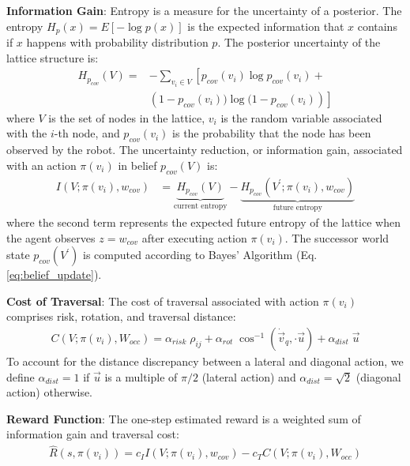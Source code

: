 \documentclass[letterpaper]{article} %
\newcommand{\ph}[1]{{\textbf{#1}:}} %
\begin{document}
\ph{Information Gain} Entropy is a measure for the uncertainty of a posterior. The entropy $H_p(x) = E[-\log p(x)]$ is the expected information that $x$ contains if $x$ happens with probability distribution $p$. The posterior uncertainty of the lattice structure is:
\begin{align}
    H_{p_{cov}}(V) =& 
    -\sum_{v_i \in V} \left[ p_{cov}(v_i) \log p_{cov}(v_i) + \right. \nonumber \\
      & \left. \left(1-p_{cov}(v_i)) \log (1-p_{cov}(v_i)\right) \right]
\end{align}
where $V$ is the set of nodes in the lattice, $v_i$ is the random variable associated with the $i$-th node, and $p_{cov}(v_i)$ is the probability that the node has been observed by the robot. The uncertainty reduction, or information gain, associated with an action $\pi(v_i)$ in belief $p_{cov}(V)$ is:
\begin{align}
    I(V; \pi(v_i), w_{cov}) &= \underbrace{H_{p_{cov}}(V)}_\text{current entropy} - \underbrace{H_{p_{cov}}(V^\prime; \pi(v_i), w_{cov})}_\text{future entropy}
\end{align}
where the second term represents the expected future entropy of the lattice when the agent observes $z = w_{cov}$ after executing action $\pi(v_i)$. The successor world state $p_{cov}(V^\prime)$ is computed according to Bayes' Algorithm (Eq. \ref{eq:belief_update}). 

\ph{Cost of Traversal} The cost of traversal associated with action $\pi(v_i)$ comprises risk, rotation, and traversal distance:
\begin{align}
    C(V; \pi(v_i), W_{occ}) = \alpha_{risk} \; \rho_{ij} + \alpha_{rot} \;  \cos^{-1}(\dot{\vec{v}}_q, \cdot \vec{u}) + \alpha_{dist} \; \vec{u}
    \label{eq:traversal_cost}
\end{align}
To account for the distance discrepancy between a lateral and diagonal action, we define $\alpha_{dist}=1$ if $\vec{u}$ is a multiple of $\pi/2$ (lateral action) and $\alpha_{dist}=\sqrt{2}$ (diagonal action) otherwise.





\ph{Reward Function} The one-step estimated reward is a weighted sum of information gain and traversal cost:
\begin{align}
    \hat{R}(s, \pi(v_i)) = c_{I} I(V; \pi(v_i), w_{cov}) - c_{T}  C(V; \pi(v_i), W_{occ})
    \label{eq:lattice_reward}
\end{align}
\end{document}
